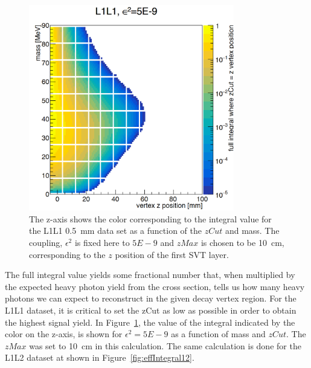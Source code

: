 \begin{figure}[H]
  \centering
      \includegraphics[width=0.8\textwidth]{pics/searching/integralEffL1L1.png}
  \caption[Integral as a function of mass and $zCut$ for L1L1]{The z-axis shows the color corresponding to the integral value for the L1L1 0.5~mm data set as a function of the $zCut$ and mass. The coupling, $\epsilon^2$ is fixed here to $5E-9$ and $zMax$ is chosen to be 10~cm, corresponding to the $z$ position of the first SVT layer. }
  \label{fig:effIntegral}
\end{figure}

The full integral value yields some fractional number that, when multiplied by the expected heavy photon yield from the cross section, tells us how many heavy photons we can expect to reconstruct in the given decay vertex region. For the L1L1 dataset, it is critical to set the zCut as low as possible in order to obtain the highest signal yield. In Figure~\ref{fig:effIntegral}, the value of the integral indicated by the color on the z-axis, is shown for $\epsilon^{2} = 5E-9$ as a function of mass and $zCut$. The $zMax$ was set to 10~cm in this calculation. The same calculation is done for the L1L2 dataset at shown in Figure~\ref{fig:effIntegral12}.

